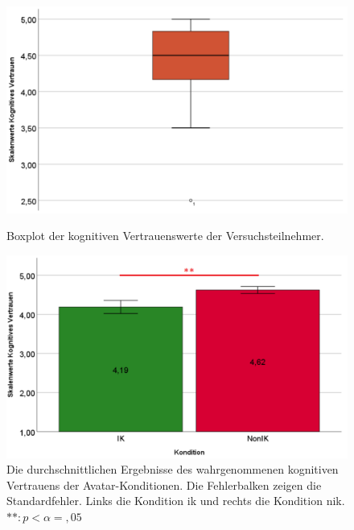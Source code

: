 \documentclass[a4paper,11pt]{article}%
\renewcommand{\\}{\vspace*{0.5\baselineskip} \newline}
\begin{document}
{{{{{{	\begin{figure}[H]
   \begin{minipage}[t]{.5\linewidth} %
      \includegraphics[width=\linewidth]{Abbildungen/AuswertungDiagramme/Final/BP_kognitivesVertrauen.png}
      \caption[Boxplot der kognitiven Vertrauenswerte der Versuchsteilnehmer]{Boxplot der kognitiven Vertrauenswerte der Versuchsteilnehmer.}
            \label{SD_kognitivesVertrauenBP}
   \end{minipage}
   \hspace{.02\linewidth}%
   \begin{minipage}[t]{.5\linewidth} %
     \includegraphics[width=\linewidth]{Abbildungen/AuswertungDiagramme/Final/H1_Mittelwerte.png}
      \caption[Mittelwerte und der Standardfehler der kognitiven Vertrauenswerte]{Die durchschnittlichen Ergebnisse des wahrgenommenen kognitiven Vertrauens der Avatar-Konditionen. Die Fehlerbalken zeigen die Standardfehler. Links die Kondition \ac{ik} und rechts die Kondition \ac{nik}. $** : p < \alpha =,05$}
       \label{H1_Mittelwerte_Auswertung}
   \end{minipage}
\end{figure}

}}}}}}
\end{document}
